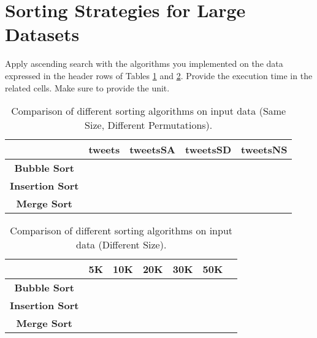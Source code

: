 \label{implementation}

\section{Sorting Strategies for Large Datasets}

Apply ascending search with the algorithms you implemented on the data expressed in the header rows of Tables \ref{dataPermutation} and \ref{dataSize}. Provide the execution time in the related cells. Make sure to provide the unit. 

\begin{table}[h!]
\centering
\begin{tabular}{|c|c|c|c|c|}
\hline
                        & \textbf{tweets} & \textbf{tweetsSA} & \textbf{tweetsSD} & \textbf{tweetsNS} \\ \hline
\textbf{Bubble Sort}    &                 &                   &                   &                   \\ \hline
\textbf{Insertion Sort} &                 &                   &                   &                   \\ \hline
\textbf{Merge Sort}     &                 &                   &                   &                   \\ \hline

\end{tabular}
\caption{Comparison of different sorting algorithms on input data (Same Size, Different Permutations). }
\label{dataPermutation}
\end{table}

\begin{table}[h!]
\centering
\begin{tabular}{|c|c|c|c|c|c|c|}
\hline
                        & \textbf{5K} & \textbf{10K} & \textbf{20K} & \textbf{30K} & \textbf{50K} \\ \hline
\textbf{Bubble Sort}    &             &              &              &              &              \\ \hline
\textbf{Insertion Sort} &             &              &              &              &              \\ \hline
\textbf{Merge Sort}     &             &              &              &              &              \\ \hline
\end{tabular}
\caption{Comparison of different sorting algorithms on input data (Different Size). }
\label{dataSize}
\end{table}

